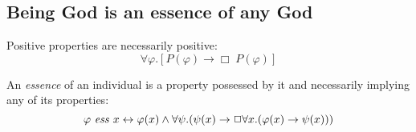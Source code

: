 \documentclass{llncs}
\newcommand{\imp}{\rightarrow}
\newcommand{\biimp}{\leftrightarrow}
\newcommand{\all}{\forall}
\newcommand{\nec}{\Box} %
\begin{document}
\subsection{Being God is an essence of any God}

\begin{axiom}
\label{A4}
Positive properties are necessarily positive:
$$
\all \varphi.[P(\varphi) \to \Box \; P(\varphi)]
$$
\end{axiom}

\begin{definition}
\label{D2}
An \emph{essence} of an individual is a property possessed by it and necessarily implying any of its properties:
$$
\ess{\varphi}{x} \biimp \varphi(x) \wedge \all \psi. (\psi(x) \imp \nec \all x. (\varphi(x) \imp \psi(x)))
$$
\end{definition}
\end{document}
